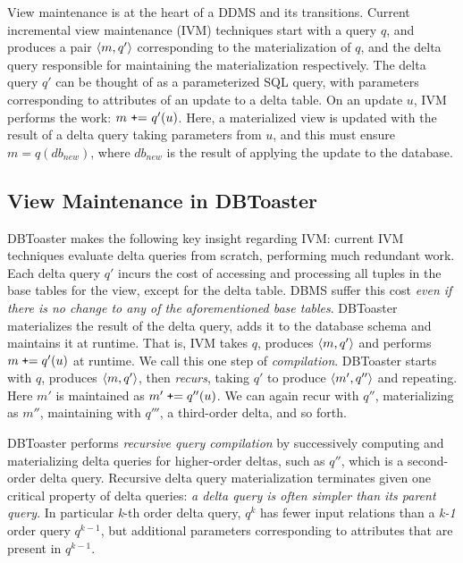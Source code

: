\label{sec:compilation}

View maintenance is at the heart of a DDMS and its transitions.
Current incremental view maintenance (IVM) techniques start with a query $q$,
and produces a pair ${\langle m,q'\rangle}$ corresponding to the materialization of $q$,
and the delta query responsible for maintaining the materialization
respectively. The delta query $q'$ can be thought of as a parameterized SQL
query, with parameters corresponding to attributes of an update to a delta
table. On an update $u$, IVM performs the work: $m \mbox{ {\tt+}= } q'(u)$.
Here, a materialized view is updated with the result of a delta query taking
parameters from $u$, and this must ensure $m = q(db_{new})$, where $db_{new}$ is
the result of applying the update to the database.

\subsection{View Maintenance in DBToaster}
DBToaster makes the following key insight regarding IVM: current IVM techniques
evaluate delta queries from scratch, performing much redundant work. Each delta
query $q'$ incurs the cost of accessing and processing all tuples in the base
tables for the view, except for the delta table. DBMS suffer this cost
\textit{even if there is no change to any of the aforementioned base tables}.
DBToaster materializes the result of the delta query, adds it to the database
schema and maintains it at runtime.
That is, IVM takes $q$, produces ${\langle m,q'\rangle}$ and performs
$m \; \mbox{{\tt +}=} \; q'(u)$ at runtime. We call this one step of
\textit{compilation}. DBToaster starts with $q$, produces
${\langle m,q'\rangle}$, then \textit{recurs}, taking $q'$ to produce ${\langle m', q''\rangle}$
and repeating. Here $m'$ is maintained as $m' \; \mbox{{\tt +}=} \; q''(u)$.
We can again recur with $q''$, materializing as $m''$, maintaining with
$q'''$, a third-order delta, and so forth.

DBToaster performs \textit{recursive query compilation} by successively
computing and materializing delta queries for higher-order deltas, such as
$q''$, which is a second-order delta query. Recursive delta query
materialization terminates given one critical property of delta queries:
\textit{a delta query is often simpler than its parent query}. In particular
\textit{k}-th order delta query, $q^k$ has fewer input relations than a
\textit{k-1} order query $q^{k-1}$, but additional parameters corresponding to
attributes that are present in $q^{k-1}$.

